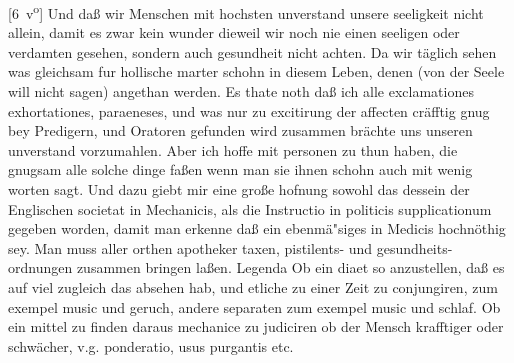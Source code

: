 [6~v\textsuperscript{o}]
\pend%
\pstart%
Und da{\ss} wir Menschen mit hochsten unverstand unsere seeligkeit nicht allein, damit es zwar kein wunder dieweil wir noch nie einen seeligen oder verdamten gesehen, sondern auch gesundheit\protect{} nicht achten. Da wir t\"{a}glich sehen was gleichsam fur hollische marter schohn in diesem Leben, denen
(von der Seele will nicht sagen) angethan werden.
\pend%
\count{}
\pstart%
Es thate noth da{\ss} ich alle exclamationes exhortationes, paraeneses, und was nur zu excitirung der affecten cr\"{a}fftig gnug bey Predigern, und Oratoren gefunden wird zusammen br\"{a}chte uns unseren unverstand vorzumahlen.
\pend%
\pstart%
Aber ich hoffe mit personen zu thun haben, die gnugsam alle solche dinge fa{\ss}en wenn man sie ihnen schohn auch mit wenig worten sagt. Und dazu giebt mir eine gro{\ss}e hofnung sowohl das dessein der Englischen societat in Mechanicis, als die Instructio in politicis
supplicationum gegeben worden, damit man erkenne da{\ss} ein ebenm\"{a}"siges in Medicis\protect{} hochn\"{o}thig sey.
\pend%
\pstart%
Man muss aller orthen apotheker taxen\protect{}, pistilents- und gesundheits-ordnungen\protect{} zusammen bringen la{\ss}en.
Legenda 
%
%
\pend%
\pstart%
Ob ein diaet\protect{} so anzustellen,
da{\ss} es auf viel zugleich das absehen hab, und etliche zu einer Zeit zu conjungiren,
zum exempel music\protect{} und geruch,\protect{}
andere separaten zum exempel music und schlaf.\protect{}
\pend%
\pstart%
Ob ein mittel zu finden daraus mechanice zu judiciren ob der Mensch krafftiger oder schw\"{a}cher, v.g. ponderatio, usus purgantis etc.%
